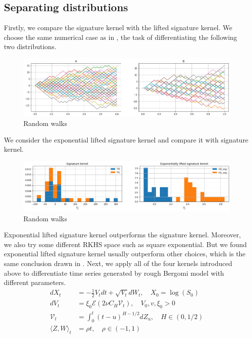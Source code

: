 \documentclass[12pt]{report}
\theoremstyle{definition}
\theoremstyle{remark}
\begin{document}
\subsection{Separating distributions}
Firstly, we compare the signature kernel with the lifted signature kernel. We choose the same numerical case as in \cite{chevyrev2018signature}, the task of differentiating the following two distributions. 
 \begin{figure}[H]
    \centering
    \includegraphics[width=\textwidth]{figs/estimation1.png}
    \caption{Random walks}
\end{figure}
We consider the exponential lifted signature kernel and compare it with signature kernel. 
 \begin{figure}[H]
    \centering
    \includegraphics[width=\textwidth]{figs/estimation2.png}
    \caption{Random walks}
\end{figure}
Exponential lifted signature kernel outperforms the signature kernel. Moreover, we also try some different RKHS space such as square exponential. But we found exponential lifted signature kernel usually outperform other choices, which is the same conclusion drawn in \cite{chevyrev2018signature}. Next, we apply all of the four kernels introduced above to differentiate time series generated by rough Bergomi model with different parameters. 
\begin{equation}
  \begin{split}
    dX_{t} &= -\frac{1}{2}V_{t}dt + \sqrt{V_{t}}dW_{t}, \quad X_{0} = \log(S_{0})\\
    dV_{t} &= \xi_{0}\mathcal{E}(2\nu C_{H}\mathcal{V}_{t}),\quad V_{0}, v, \xi_{0} > 0\\
    \mathcal{V}_{t} &= \int_{0}^{t}(t-u)^{H - 1/2}dZ_{u},\quad H \in (0,1/2)\\
    \langle Z, W \rangle_{t} &= \rho t, \quad \rho \in (-1,1)
  \end{split}
\end{equation} 
\end{document}
